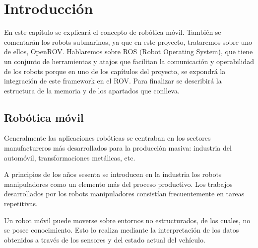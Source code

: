 \chapter{Introducción}

En este capítulo se explicará el concepto de robótica móvil\cite{RoboticaMovil}.
También se comentarán los robots submarinos, ya que en este proyecto, trataremos sobre uno de ellos, OpenROV.
Hablaremos sobre ROS (Robot Operating System), que tiene un conjunto de herramientas y atajos que facilitan la comunicación y operabilidad de los robots porque en uno de los capítulos del proyecto, se expondrá la integración de este framework en el ROV.
Para finalizar se describirá la estructura de la memoria y de los apartados que conlleva.

\section{Robótica móvil}
\label{cap:roboticamovil}
Generalmente las aplicaciones robóticas se centraban en los sectores manufactureros más desarrollados para la producción masiva: industria del automóvil, transformaciones metálicas, etc.

A principios de los años sesenta se introducen en la industria los robots manipuladores como un elemento más del proceso productivo. Los trabajos desarrollados por los robots manipuladores consistían frecuentemente en tareas repetitivas.

Un robot móvil puede moverse sobre entornos no estructurados, de los cuales, no se posee conocimiento. Esto lo realiza mediante la interpretación de los datos obtenidos a través de los sensores y del estado actual del vehículo. 

